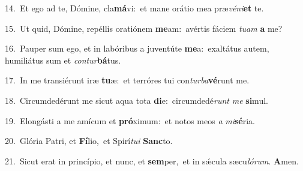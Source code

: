 {\numbfont\textcolor{\numbcolor}{14.}}~Et ego ad te, Dómine, cla\-\textbf{má}\-vi:~\star et mane orátio mea præ\-\textit{vé}\-\textit{ni}\textbf{et} te.\par
{\numbfont\textcolor{\numbcolor}{15.}}~Ut quid, Dómine, repéllis oratiónem \textbf{me}\-am:~\star avértis fáciem \textit{tu}\-\textit{am} \textbf{a} me?\par
{\numbfont\textcolor{\numbcolor}{16.}}~Pauper sum ego, et in labóribus a juventúte \textbf{me}\-a:~\star exaltátus autem, humiliátus sum et \textit{con}\-\textit{tur}\textbf{bá}tus.\par
{\numbfont\textcolor{\numbcolor}{17.}}~In me transiérunt iræ \textbf{tu}\-æ:~\star et terróres tui con\-\textit{tur}\-\textit{ba}\textbf{vé}runt me.\par
{\numbfont\textcolor{\numbcolor}{18.}}~Circumdedérunt me sicut aqua tota \textbf{di}\-e:~\star circumdedé\textit{runt} \textit{me} \textbf{si}\-mul.\par
{\numbfont\textcolor{\numbcolor}{19.}}~Elongásti a me amícum et \textbf{pró}\-ximum:~\star et notos meos \textit{a} \textit{mi}\-\textbf{sé}ria.\par
{\numbfont\textcolor{\numbcolor}{20.}}~Glória Patri, et \textbf{Fí}\-lio,~\star et Spirí\-\textit{tu}\-\textit{i} \textbf{Sanc}\-to.\par
{\numbfont\textcolor{\numbcolor}{21.}}~Sicut erat in princípio, et nunc, et \textbf{sem}\-per,~\star et in sǽcula sæcu\-\textit{ló}\-\textit{rum}. \textbf{A}\-men.\par
